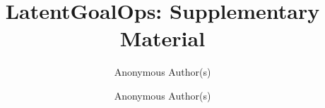 \documentclass{article}
\title{LatentGoalOps: Supplementary Material}
\author{Anonymous Author(s)}
\author{Anonymous Author(s)}
\date{}
\begin{document}
\raggedbottom
\maketitle





\end{document}
